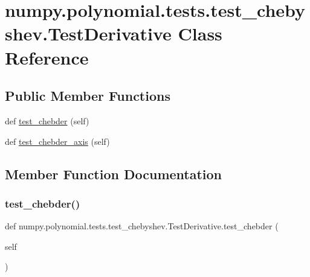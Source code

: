 \hypertarget{classnumpy_1_1polynomial_1_1tests_1_1test__chebyshev_1_1TestDerivative}{}\section{numpy.\+polynomial.\+tests.\+test\+\_\+chebyshev.\+Test\+Derivative Class Reference}
\label{classnumpy_1_1polynomial_1_1tests_1_1test__chebyshev_1_1TestDerivative}
\subsection*{Public Member Functions}
\begin{DoxyCompactItemize}
\item 
def \hyperlink{classnumpy_1_1polynomial_1_1tests_1_1test__chebyshev_1_1TestDerivative_a21ecea1b11bd7b426abe3df4658ece1a}{test\+\_\+chebder} (self)
\item 
def \hyperlink{classnumpy_1_1polynomial_1_1tests_1_1test__chebyshev_1_1TestDerivative_ac9d9aa1343a252e0588ce0c42289aeaf}{test\+\_\+chebder\+\_\+axis} (self)
\end{DoxyCompactItemize}


\subsection{Member Function Documentation}
\mbox{\label{classnumpy_1_1polynomial_1_1tests_1_1test__chebyshev_1_1TestDerivative_a21ecea1b11bd7b426abe3df4658ece1a}} 
\subsubsection{\texorpdfstring{test\+\_\+chebder()}{test\_chebder()}}
{\footnotesize\ttfamily def numpy.\+polynomial.\+tests.\+test\+\_\+chebyshev.\+Test\+Derivative.\+test\+\_\+chebder (\begin{DoxyParamCaption}\item[{}]{self }\end{DoxyParamCaption})}

